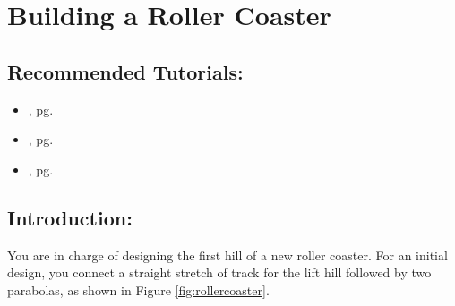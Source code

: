\section{Building a Roller Coaster}
\label{sec:building_a_roller_coaster}

\subsection*{Recommended Tutorials:}
\begin{itemize}[noitemsep]
	\item {}, pg. \pageref{chp:assignment_operator}
	\item {}, pg. \pageref{chp:equation_solvers}
	\item {}, pg. \pageref{chp:derivative}
\end{itemize}

\subsection*{Introduction:}
You are in charge of designing the first hill of a new roller coaster. For an initial design, you connect a straight stretch of track for the lift hill followed by two parabolas, as shown in Figure \ref{fig:rollercoaster}.

